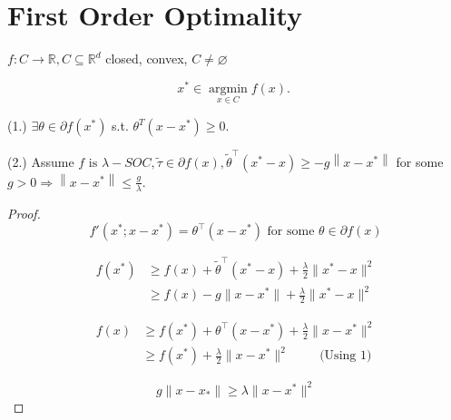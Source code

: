 \documentclass[twoside]{article}
\begin{document}
\section{First Order Optimality}
\begin{lemma}

$f : C \rightarrow \mathbb{R}, C \subseteq \mathbb{R}^{d}$ closed, convex, $C \neq \varnothing$

$$
x^{*} \in \underset{x \in C}{\operatorname{argmin}} f(x) \text {. }
$$


(1.) $\exists \theta \in \partial f\left(x^{*}\right)$ s.t. $\theta^{T}\left(x-x^{*}\right) \geq 0$.

(2.) Assume $f \text{ is } \lambda-S O C, \tilde{\tau} \in \partial f(x), \tilde{\theta}^{\top}\left(x^{*}-x\right) \geq-g\left\|x-x^{*}\right\|$ for some $g>0 \Rightarrow\left\|x-x^{*}\right\| \leq \frac{g}{\lambda}$.
\end{lemma}

\begin{proof}
\begin{equation*}
    f'(x^*; x-x^*) = \theta^\top (x-x^*) \text{ for some $\theta \in  \partial f(x)$}
\end{equation*}

\begin{align*}
    f(x^*) &\geqslant f(x) + \tilde{\theta}^\top (x^* - x) + \frac{\lambda}{2} \|x^* - x\|^2 \\
    &\geqslant f(x) - g \|x - x^*\| + \frac{\lambda}{2} \|x^* - x\|^2
\end{align*}

\begin{align*}
    f(x) &\geq f(x^*) + \theta^\top (x - x^*) + \frac{\lambda}{2} \|x - x^*\|^2 \\
    &\geqslant f(x^*) + \frac{\lambda}{2} \|x - x^*\|^2 \hspace{1cm} \text{(Using 1)}
\end{align*}

\begin{equation*}
    g \|x - x_*\| \geqslant \lambda \|x - x^*\|^2
\end{equation*}

\hspace{6cm} 

\end{proof}
\end{document}
